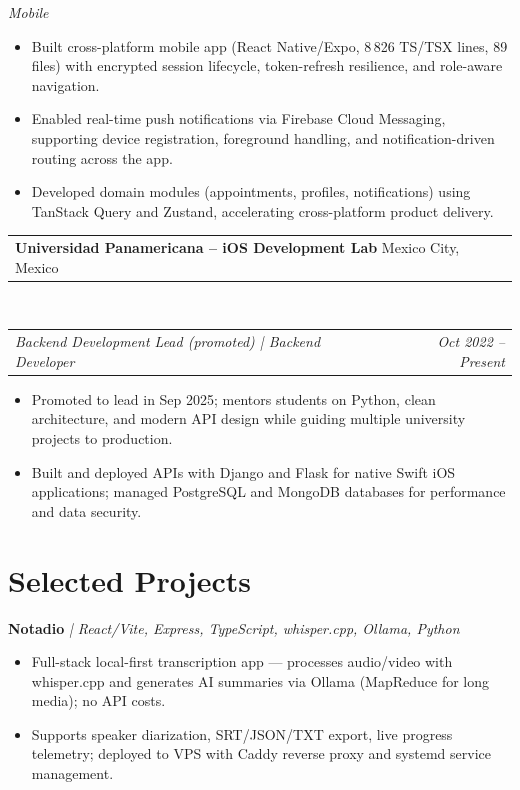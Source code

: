 \documentclass[10pt, letterpaper]{article}
\makeatletter
\newcommand{\entry}[2]{%
  \noindent\begin{tabular*}{\textwidth}{@{}l@{\extracolsep{\fill}}r@{}}
    #1 & #2
  \end{tabular*}}
\newenvironment{cvlist}{%
  \begin{itemize}[leftmargin=1.2em,itemsep=0.5pt,topsep=2pt,parsep=0pt]
}{\end{itemize}}
\makeatother
\begin{document}
\smallskip
\textit{Mobile}
\begin{cvlist}
  \item Built cross-platform mobile app (React Native/Expo, 8\,826 TS/TSX lines, 89 files)
        with encrypted session lifecycle, token-refresh resilience, and role-aware navigation.
  \item Enabled real-time push notifications via Firebase Cloud Messaging, supporting device
        registration, foreground handling, and notification-driven routing across the app.
  \item Developed domain modules (appointments, profiles, notifications) using TanStack Query
        and Zustand, accelerating cross-platform product delivery.
\end{cvlist}

\medskip

\entry{\textbf{Universidad Panamericana -- iOS Development Lab} \quad Mexico City, Mexico}{}\\
\entry{\textit{Backend Development Lead (promoted) \textnormal{|} Backend Developer}}%
      {\textit{Oct 2022 -- Present}}

\begin{cvlist}
  \item Promoted to lead in Sep 2025; mentors students on Python, clean architecture, and
        modern API design while guiding multiple university projects to production.
  \item Built and deployed APIs with Django and Flask for native Swift iOS applications;
        managed PostgreSQL and MongoDB databases for performance and data security.
\end{cvlist}

\section{Selected Projects}

\noindent\textbf{Notadio} \textit{| React/Vite, Express, TypeScript, whisper.cpp, Ollama, Python}
\begin{cvlist}
  \item Full-stack local-first transcription app — processes audio/video with whisper.cpp
        and generates AI summaries via Ollama (MapReduce for long media); no API costs.
  \item Supports speaker diarization, SRT/JSON/TXT export, live progress telemetry;
        deployed to VPS with Caddy reverse proxy and systemd service management.
\end{cvlist}
\end{document}

